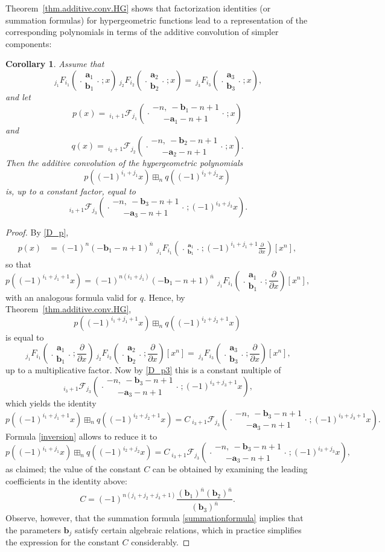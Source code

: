 \documentclass[reqno,11pt]{amsart}
\newtheorem{corollary}[theorem]{Corollary}
\theoremstyle{remark}
\newcommand{\raising}[2]{\left(#1\right)^{\overline{#2}}}
\newcommand*\pFq[5]{%
 {\ }_{#1}{\mathcal F}_{#2}{\left(\genfrac..{0pt}{}{#3}{#4};#5\right)}%
}
\newcommand*\HGF[5]{%
 {\ }_{#1} F_{#2}{\left(\genfrac..{0pt}{}{#3}{#4};#5\right)}%
}
\begin{document}
Theorem~\ref{thm.additive.conv.HG} shows that factorization identities (or summation formulas) for hypergeometric functions lead to a representation of the corresponding polynomials in terms of the additive convolution of simpler components:
\begin{corollary}
\label{cor.additive.conv.as.poruduct.HG}
Assume that
\begin{equation}
    \label{summationformula}
    \HGF{j_1}{i_1}{\bm a_1}{\bm b_1}{x}  \HGF{j_2}{i_2}{\bm a_2}{\bm b_2}{ x}=\HGF{j_3}{i_3}{\bm a_3}{\bm b_3}{x},
\end{equation}
and let 
$$
p(x)=\pFq{i_1+1}{j_1}{-n,\ -\bm b_1-n+1}{-\bm a_1-n+1}{ x} 
$$
and
$$
q(x)=\pFq{i_2+1}{j_2}{-n,\ -\bm b_2-n+1}{-\bm a_2-n+1}{ x}.
$$
Then the additive convolution of the hypergeometric polynomials
$$
p\left((-1)^{i_1+j_1} x \right)\boxplus_n q\left((-1)^{i_2+j_2} x \right) 
$$
is, up to a constant factor, equal to 
$$
\pFq{i_3+1}{j_3}{-n,\ -\bm b_3-n+1}{-\bm a_3-n+1}{(-1)^{i_3+j_3}  x}.
$$
\end{corollary}
\begin{proof}
    By \eqref{D_p}, 
    \begin{align*}
        p(x) &=   (-1)^n \raising{-\bm b_1-n+1}{n}  \, \HGF{j_1}{i_1}{ \bm a_1}{ \bm b_1}{(-1)^{i_1+j_1+1}\frac{\partial}{\partial x}} [x^n],
    \end{align*}
    so that
    $$
    p\left((-1)^{i_1+j_1+1} x \right) =  (-1)^{n(i_1+j_1)} \raising{-\bm b_1-n+1}{n}  \, \HGF{j_1}{i_1}{ \bm a_1}{ \bm b_1}{\frac{\partial}{\partial x}} [x^n],
    $$
    with an analogous formula valid for $q$. Hence, by Theorem~\ref{thm.additive.conv.HG}, 
    $$
    p\left((-1)^{i_1+j_1+1} x \right)\boxplus_n q\left((-1)^{i_2+j_2+1} x \right)
    $$ 
    is equal to
    $$
    \HGF{j_1}{i_1}{ \bm a_1}{ \bm b_1}{ \frac{\partial}{\partial x}} \HGF{j_2}{i_2}{ \bm a_2}{ \bm b_2}{ \frac{\partial}{\partial x}}[x^n] = \HGF{j_3}{i_3}{\bm a_3}{\bm b_3}{\frac{\partial}{\partial x}}[x^n],
    $$
    up to a multiplicative factor. Now by \eqref{D_p3} this is a constant multiple of 
    $$
    \pFq{i_3+1}{j_3}{-n,\ -\bm b_3-n+1}{-\bm a_3-n+1}{(-1)^{i_3+j_3+1}  x},
    $$
    which yields the identity
    $$
    p\left((-1)^{i_1+j_1+1} x \right)\boxplus_n q\left((-1)^{i_2+j_2+1} x \right) = C \pFq{i_3+1}{j_3}{-n,\ -\bm b_3-n+1}{-\bm a_3-n+1}{(-1)^{i_3+j_3+1}  x}.
    $$
    Formula \eqref{inversion} allows to reduce it to 
    $$
    p\left((-1)^{i_1+j_1} x \right)\boxplus_n q\left((-1)^{i_2+j_2} x \right) = C \pFq{i_3+1}{j_3}{-n,\ -\bm b_3-n+1}{-\bm a_3-n+1}{(-1)^{i_3+j_3}  x},
    $$
    as claimed; the value of the constant $C$ can be obtained by examining the leading coefficients in the identity above:
    $$
    C=(-1)^{n(j_1+j_2+j_3+1)} \frac{\raising{\bm b_1}{n} \raising{\bm b_2}{n} }{\raising{\bm b_3}{n}}.
    $$
   Observe, however, that the summation formula \eqref{summationformula} implies that the parameters  $\bm b_j$ satisfy certain algebraic relations, which in practice simplifies the expression for the constant $C$ considerably.
\end{proof}
\end{document}
